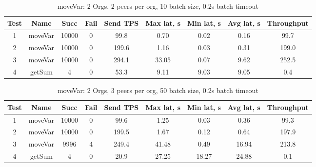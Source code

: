 \begin{appendices}
\begin{table}[h!]
\begin{center}
\begin{tabular}{ |c|c|c|c|c|c|c|c|c| }
 \hline
  Test & Name & Succ  & Fail & Send TPS & Max lat, s & Min lat, s & Avg lat, s & Throughput \\
 \hline
 \hline
 1    & moveVar & 10000 & 0    & 99.8  & 0.70      & 0.02      & 0.16      & 99.7 \\
 \hline
 2    & moveVar & 10000 & 0    & 199.6 & 1.16      & 0.03      & 0.31      & 199.0 \\
 \hline
 3    & moveVar & 10000 & 0    & 294.1 & 33.05     & 0.07      & 9.62      & 252.5 \\
 \hline
 4    & getSum  & 4     & 0    & 53.3  & 9.11      & 9.03      & 9.05      & 0.4 \\
 \hline
\end{tabular}
\end{center}
\caption{moveVar: 2 Orgs, 2 peers per org, 10 batch size, 0.2s batch timeout}
\end{table}

\begin{table}[h!]
\begin{center}
\begin{tabular}{ |c|c|c|c|c|c|c|c|c| }
 \hline
  Test & Name & Succ  & Fail & Send TPS & Max lat, s & Min lat, s & Avg lat, s & Throughput \\
 \hline
 \hline
 1    & moveVar & 10000 & 0    & 99.6  & 1.25       & 0.03       & 0.36       & 99.3  \\
 \hline
 2    & moveVar & 10000 & 0    & 199.5 & 1.67       & 0.12       & 0.64       & 197.9 \\
 \hline
 3    & moveVar & 9996  & 4    & 249.4 & 41.48      & 0.49       & 16.94      & 213.8 \\
 \hline
 4    & getSum  & 4     & 0    & 20.9  & 27.25      & 18.27      & 24.88      & 0.1   \\
 \hline
\end{tabular}
\end{center}
\caption{moveVar: 2 Orgs, 3 peers per org, 50 batch size, 0.2s batch timeout}
\end{table}


\end{appendices}
